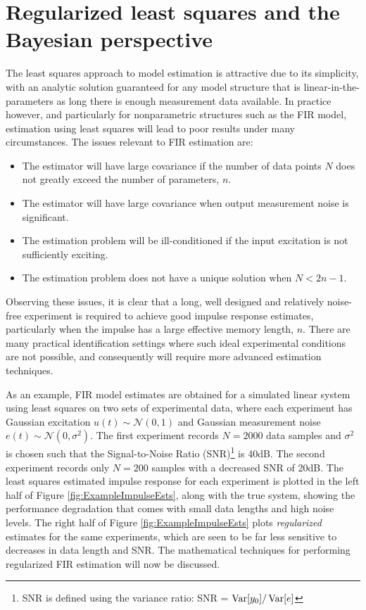 \section{Regularized least squares and the Bayesian {perspective}}
\label{sec:ReLS_Chap2}

The least squares approach to model estimation is attractive due to its simplicity, with an analytic solution guaranteed for any model structure that is linear-in-the-parameters as long there is enough measurement data available. In practice however, and particularly for nonparametric structures such as the FIR model, estimation using least squares will lead to poor results under many circumstances. The issues relevant to FIR estimation are:
\begin{itemize}
\item The estimator will have large covariance if the number of data points $N$ does not greatly exceed the number of parameters, $n$.
\item The estimator will have large covariance when output measurement noise is significant.
\item The estimation problem will be ill-conditioned if the input excitation is not sufficiently exciting.
\item The estimation problem does not have a unique solution when $N < 2n-1$.  
\end{itemize} 
Observing these issues, it is clear that a long, well designed and relatively noise-free experiment is required to achieve good impulse response estimates, particularly when the impulse has a large effective memory length, $n$. There are many practical identification settings where such ideal experimental conditions are not possible, and consequently will require more advanced estimation techniques. 

As an example, FIR model estimates are obtained for a simulated linear system using least squares on two sets of experimental data, where each experiment has Gaussian excitation $u(t) \sim \mathcal{N}(0,1)$ and Gaussian measurement noise $e(t) \sim \mathcal{N}(0,\sigma^2)$.  The first experiment records $N=2000$ data samples and $\sigma^2$ is chosen such that the Signal-to-Noise Ratio (SNR)\footnote{SNR is defined using the variance ratio: SNR = $\operatorname{Var} [y_0]/\operatorname{Var} [e]$} is 40dB. The second experiment records only $N=200$ samples with a decreased SNR of 20dB. The least squares estimated impulse response for each experiment is plotted in the left half of Figure \ref{fig:ExampleImpulseEsts}, along with the true system, showing the performance degradation that comes with small data lengths and high noise levels. The right half of Figure \ref{fig:ExampleImpulseEsts} plots \emph{regularized} estimates for the same experiments, which are seen to be far less sensitive to decreases in data length and SNR. The mathematical techniques for performing regularized FIR estimation will now be discussed.


